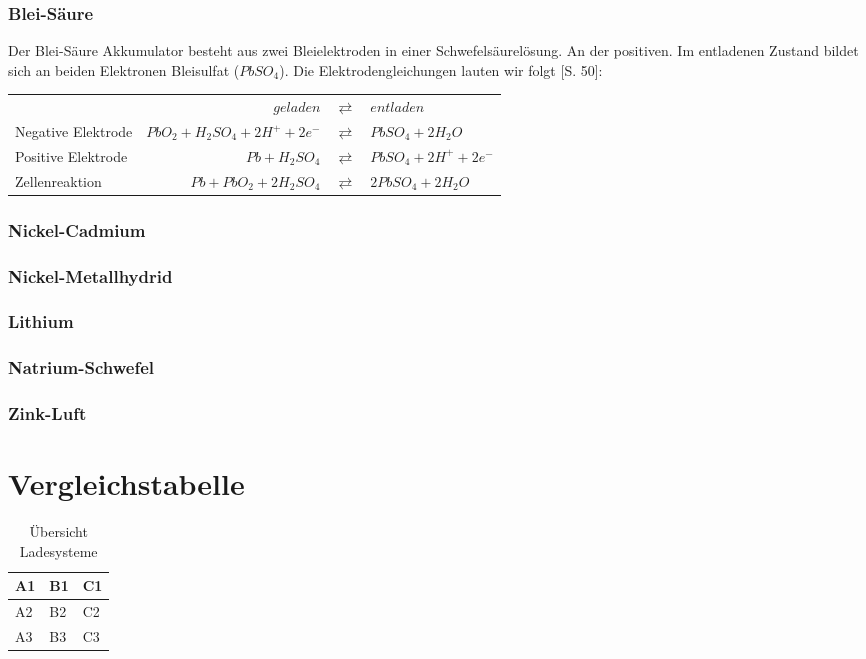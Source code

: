 \subsubsection{Blei-Säure}
Der Blei-Säure Akkumulator besteht aus zwei Bleielektroden in einer Schwefelsäurelösung. An der positiven. Im entladenen Zustand bildet sich an beiden Elektronen Bleisulfat ($PbSO_4$). Die Elektrodengleichungen lauten wir folgt \cite{KiehneBattery}[S. 50]:
\begin{table*}[htbp]
  \begin{tabularx}{\linewidth}{XrcX}
  	                   &                      $ geladen$ & $\rightleftarrows$ & $entladen $            \\
  	Negative Elektrode & $PbO_2 + H_2SO_4 + 2H^+ + 2e^-$ & $\rightleftarrows$ & $PbSO_4 + 2H_2O$       \\
  	Positive Elektrode &                  $Pb + H_2SO_4$ & $\rightleftarrows$ & $PbSO_4 + 2H^+ + 2e^-$ \\ \midrule
  	Zellenreaktion     &         $Pb + PbO_2 + 2H_2SO_4$ & $\rightleftarrows$ & $2PbSO_4 + 2H_2O$
  \end{tabularx}
\end{table*}

\subsubsection{Nickel-Cadmium} %
\subsubsection{Nickel-Metallhydrid}
\subsubsection{Lithium}
\subsubsection{Natrium-Schwefel} %
\subsubsection{Zink-Luft}
\section{Vergleichstabelle}   %
\begin{table}[htbp]\centering
	\begin{tabularx}{\linewidth}{XXX}
		\toprule
		A1 & B1 & C1 \\ \midrule
		A2 & B2 & C2 \\
		A3 & B3 & C3 \\ \bottomrule
	\end{tabularx}
	\caption{Übersicht Ladesysteme}
	\label{vergleichstabelle_speichertechnologien}
\end{table}